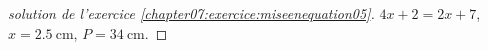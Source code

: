 \documentclass[main.tex]{subfiles}
\begin{document}
\begin{proof}[solution de l'exercice \ref{chapter07:exercice:miseenequation05}]\hfill 
	
	$4x+2=2x+7$, $x=\SI{2.5}{\centi\meter}$, $P=\SI{34}{\centi\meter}$. 
\end{proof}
%
%	
%	
\end{document}
